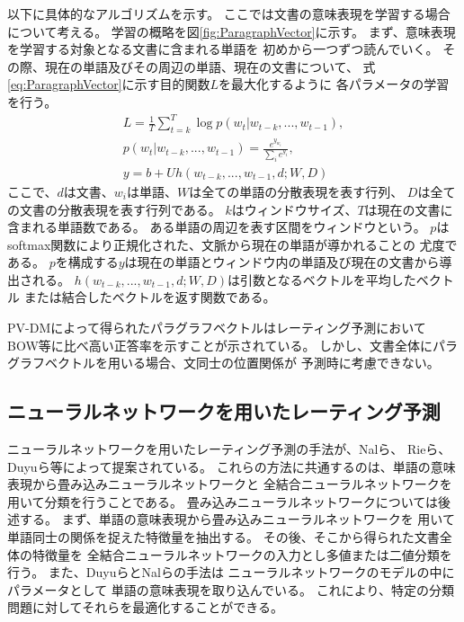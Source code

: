 以下に具体的なアルゴリズムを示す。
ここでは文書の意味表現を学習する場合について考える。
学習の概略を図\ref{fig:ParagraphVector}に示す。
まず、意味表現を学習する対象となる文書に含まれる単語を
初めから一つずつ読んでいく。
その際、現在の単語及びその周辺の単語、現在の文書について、
式\ref{eq:ParagraphVector}に示す目的関数$L$を最大化するように
各パラメータの学習を行う。
\begin{gather}
  L = \frac{1}{T} \sum^{T}_{t = k} \log p(w_t | w_{t-k}, ..., w_{t-1}),
    \label{eq:ParagraphVector} \\
  p(w_t | w_{t-k}, ..., w_{t-1}) = \frac{e^{y_{w_t}}}{\sum_i e^{y_i}},
    \nonumber \\
  y = b + Uh(w_{t-k}, ..., w_{t-1}, d; W, D) \nonumber
\end{gather}
ここで、$d$は文書、$w_i$は単語、$W$は全ての単語の分散表現を表す行列、
$D$は全ての文書の分散表現を表す行列である。
$k$はウィンドウサイズ、$T$は現在の文書に含まれる単語数である。
ある単語の周辺を表す区間をウィンドウという。
$p$はsoftmax関数により正規化された、文脈から現在の単語が導かれることの
尤度である。
$p$を構成する$y$は現在の単語とウィンドウ内の単語及び現在の文書から導出される。
$h(w_{t-k}, ..., w_{t-1}, d; W, D)$は引数となるベクトルを平均したベクトル
または結合したベクトルを返す関数である。

PV-DMによって得られたパラグラフベクトルはレーティング予測において
BOW等に比べ高い正答率を示すことが示されている。
しかし、文書全体にパラグラフベクトルを用いる場合、文同士の位置関係が
予測時に考慮できない。


\subsection{ニューラルネットワークを用いたレーティング予測}
\label{ssec:RatingPredictionByNN}

ニューラルネットワークを用いたレーティング予測の手法が、Nalら\cite{nal14}、
Rieら\cite{rie14}、Duyuら\cite{duyu15}等によって提案されている。
これらの方法に共通するのは、単語の意味表現から畳み込みニューラルネットワークと
全結合ニューラルネットワークを用いて分類を行うことである。
畳み込みニューラルネットワークについては後述する。
まず、単語の意味表現から畳み込みニューラルネットワークを
用いて単語同士の関係を捉えた特徴量を抽出する。
その後、そこから得られた文書全体の特徴量を
全結合ニューラルネットワークの入力とし多値または二値分類を行う。
また、Duyuら\cite{duyu15}とNalら\cite{nal14}の手法は
ニューラルネットワークのモデルの中にパラメータとして
単語の意味表現を取り込んでいる。
これにより、特定の分類問題に対してそれらを最適化することができる。

